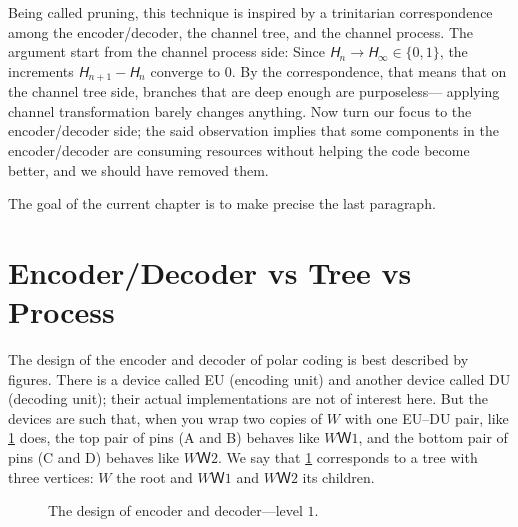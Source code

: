 \documentclass[openany]{amsbook}
\numberwithin{equation}{chapter}
\numberwithin{figure}{chapter}
\numberwithin{table}{chapter}
\theoremstyle{definition}	理dfn:Definition~?s			理exa:Example~?s
\theoremstyle{remark}		理cla:Claim~?s				理rem:Remark~?s
\begin{document}
	Being called pruning, this technique is inspired by a trinitarian correspondence
	among the encoder/decoder, the channel tree, and the channel process.
	The argument start from the channel process side:
	Since $𝘏_n→𝘏_∞∈\{0,1\}$, the increments $𝘏_{n+1}-𝘏_n$ converge to $0$.
	By the correspondence, that means that on the channel tree side,
	branches that are deep enough are purposeless---%
	applying channel transformation barely changes anything.
	Now turn our focus to the encoder/decoder side;
	the said observation implies that some components in the encoder/decoder
	are consuming resources without helping the code become better,
	and we should have removed them.
	
	The goal of the current chapter is to make precise the last paragraph.

\section{Encoder/Decoder vs Tree vs Process}

	The design of the encoder and decoder of polar coding is best described by figures.
	There is a device called EU (encoding unit)
	and another device called DU (decoding unit);
	their actual implementations are not of interest here.
	But the devices are such that, when you wrap two copies of $W$ with one EU--DU pair,
	like \cref{fig:transform} does, the top pair of pins (A and B) behaves like $WＷ1$,
	and the bottom pair of pins (C and D) behaves like $WＷ2$.
	We say that \cref{fig:transform} corresponds to a tree with three vertices:
	$W$ the root and $WＷ1$ and $WＷ2$ its children.
	
	\begin{figure}
		\caption{
			The design of encoder and decoder---level $1$.
		}\label{fig:transform}
	\end{figure}
	
\end{document}
